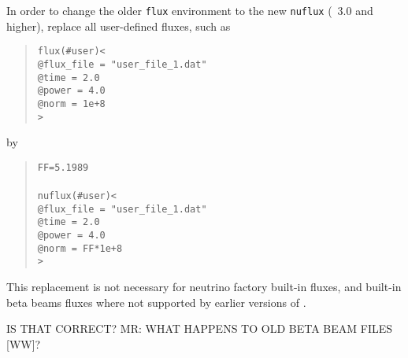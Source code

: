 \begin{appendix}
In order to change the older {\tt flux} environment to the
new {\tt nuflux} (\GLOBES\ 3.0 and higher), replace all user-defined fluxes, such as
\begin{quote}
{\tt flux(\#user)<}\\
{\tt \tb @flux\_file = "user\_file\_1.dat"\\
\tb @time = 2.0\\
\tb @power = 4.0\\
\tb @norm = 1e+8}\\
{\tt >}
\end{quote}
by
\begin{quote}
{\tt FF=5.1989} \\
\\
{\tt nuflux(\#user)<}\\
{\tt \tb @flux\_file = "user\_file\_1.dat"\\
\tb @time = 2.0\\
\tb @power = 4.0\\
\tb @norm = FF*1e+8}\\
{\tt >}
\end{quote}

This replacement is not necessary for neutrino factory built-in fluxes,
and built-in beta beams fluxes where not supported by earlier versions
of \GLOBES .

IS THAT CORRECT? MR: WHAT HAPPENS TO OLD BETA BEAM FILES [WW]?



{\footnotesize



}


\end{appendix}

